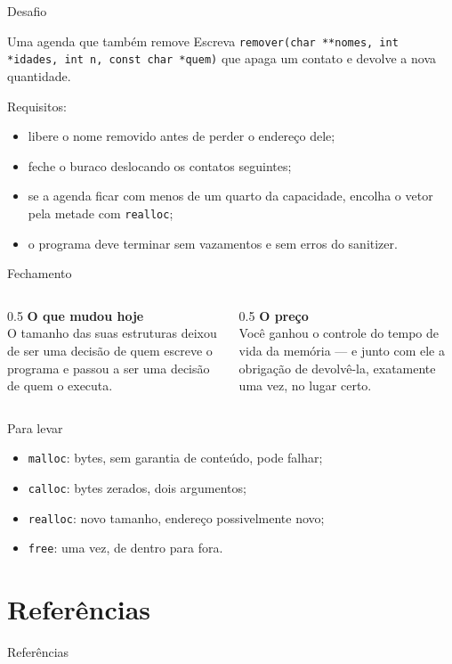 \documentclass[aspectratio=169]{beamer}
\begin{document}
\begin{frame}{Desafio}
  \begin{block}{Uma agenda que também remove}
    Escreva \texttt{remover(char **nomes, int *idades, int n, const char *quem)}
    que apaga um contato e devolve a nova quantidade.

    \medskip
    Requisitos:
    \begin{itemize}
      \item libere o nome removido antes de perder o endereço dele;
      \item feche o buraco deslocando os contatos seguintes;
      \item se a agenda ficar com menos de um quarto da capacidade, encolha o
        vetor pela metade com \texttt{realloc};
      \item o programa deve terminar sem vazamentos e sem erros do sanitizer.
    \end{itemize}
  \end{block}
\end{frame}

\begin{frame}{Fechamento}
  \begin{columns}[T]
    \begin{column}{0.5\textwidth}
      \textbf{O que mudou hoje}\\[0.3em]
      O tamanho das suas estruturas deixou de ser uma decisão de quem escreve o
      programa e passou a ser uma decisão de quem o executa.
    \end{column}
    \begin{column}{0.5\textwidth}
      \textbf{O preço}\\[0.3em]
      Você ganhou o controle do tempo de vida da memória --- e junto com ele a
      obrigação de devolvê-la, exatamente uma vez, no lugar certo.
    \end{column}
  \end{columns}
  \begin{block}{Para levar}
    \begin{itemize}
      \item \texttt{malloc}: bytes, sem garantia de conteúdo, pode falhar;
      \item \texttt{calloc}: bytes zerados, dois argumentos;
      \item \texttt{realloc}: novo tamanho, endereço possivelmente novo;
      \item \texttt{free}: uma vez, de dentro para fora.
    \end{itemize}
  \end{block}
\end{frame}

\section*{Referências}
\begin{frame}[allowframebreaks]{Referências}
  \nocite{*}
  
  
\end{frame}
\end{document}
